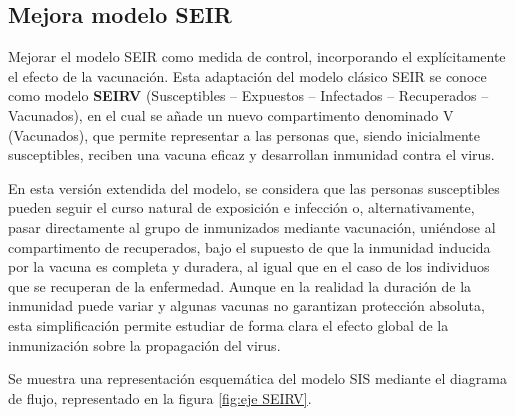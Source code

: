 \subsection{Mejora modelo SEIR}
Mejorar el modelo SEIR como medida de control, incorporando el explícitamente el efecto de la vacunación. Esta adaptación del modelo clásico SEIR se conoce como modelo \textbf{SEIRV} (Susceptibles – Expuestos – Infectados – Recuperados – Vacunados), en el cual se añade un nuevo compartimento denominado V (Vacunados), que permite representar a las personas que, siendo inicialmente susceptibles, reciben una vacuna eficaz y desarrollan inmunidad contra el virus.

En esta versión extendida del modelo, se considera que las personas susceptibles pueden seguir el curso natural de exposición e infección o, alternativamente, pasar directamente al grupo de inmunizados mediante vacunación, uniéndose al compartimento de recuperados, bajo el supuesto de que la inmunidad inducida por la vacuna es completa y duradera, al igual que en el caso de los individuos que se recuperan de la enfermedad. Aunque en la realidad la duración de la inmunidad puede variar y algunas vacunas no garantizan protección absoluta, esta simplificación permite estudiar de forma clara el efecto global de la inmunización sobre la propagación del virus.

Se muestra una representación esquemática del modelo SIS mediante el diagrama de flujo, representado en la figura \ref{fig:eje SEIRV}.


